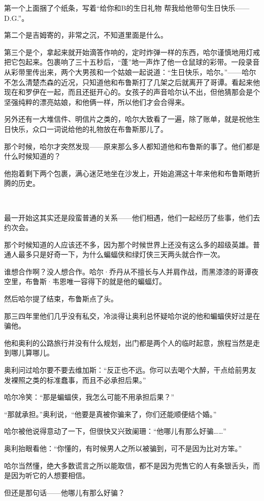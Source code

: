 \documentclass[../main]{subfiles}
\begin{document}
第一个上面捆了个纸条，写着“给你和B的生日礼物
帮我给他带句生日快乐——D.G.”。

第二个是吉姆寄的，非常之沉，不知道里面是什么。

第三个是个，拿起来就开始滴答作响的，定时炸弹一样的东西，哈尔谨慎地用灯戒把它包起来。包裹响了三十五秒后，“蓬”地一声炸了他一仓鼠球的彩带。一段录音从彩带里传出来，两个大男孩和一个姑娘一起说道：“生日快乐，哈尔。”——哈尔不怎么清楚杰森的近况，只知道他和布鲁斯打了几架之后就离开了哥谭。看起来他现在和罗伊在一起，而且还挺开心的。女孩子的声音哈尔认不出，但他猜那会是个坚强纯粹的漂亮姑娘，和他俩一样，所以他们才会合得来。

另外还有一大堆信件、明信片之类的，哈尔大致看了一遍，除了账单，就是祝他生日快乐，众口一词说给他的礼物放在布鲁斯那儿了。

那个时候，哈尔才突然发现——原来那么多人都知道他和布鲁斯的事了。他们都是什么时候知道的？

他抱着剩下两个包裹，满心迷茫地坐在沙发上，开始追溯这十年来他和布鲁斯瞎折腾的历史。

~\

最一开始这其实还是段蛮普通的关系——他们相遇，他们一起经历了些事，他们去约次会。

那个时候知道的人应该还不多，因为那个时候世界上还没有这么多的超级英雄。普通人最多只是好奇一下，为什么蝙蝠侠和绿灯侠三天两头就合作一次。

谁想合作啊？没人想合作。哈尔·乔丹从不擅长与人并肩作战，而黑漆漆的哥谭夜空里，布鲁斯·韦恩唯一容得下的就是他的蝙蝠灯。

然后哈尔提了结束，布鲁斯点了头。

那三四年里他们几乎没有私交，冷淡得让奥利总怀疑哈尔说的他和蝙蝠侠好过是在骗他。

他和奥利的公路旅行并没有什么规划，出门都是两个人的临时起意，旅程当然是走到哪儿算哪儿。

奥利问过哈尔要不要去维加斯：“反正也不远。你可以去喝个大醉，干点给前男友发裸照之类的标准蠢事，而且不必承担后果。”

哈尔冷笑：“那是蝙蝠侠，我怎么可能不用承担后果？”

“那就承担。”奥利说，“他要是真被你骗来了，你们还能顺便结个婚。”

哈尔被他说得意动了一下，但很快又兴致阑珊：“他哪儿有那么好骗……”

奥利抬眼看他：“你懂的，有时候男人之所以被骗到，可不是因为比对方笨。”

哈尔当然懂，绝大多数谎言之所以能取信，都不是因为兜售它的人有条银舌头，而是因为听它的人想要相信。

但还是那句话——他哪儿有那么好骗？
\end{document}
